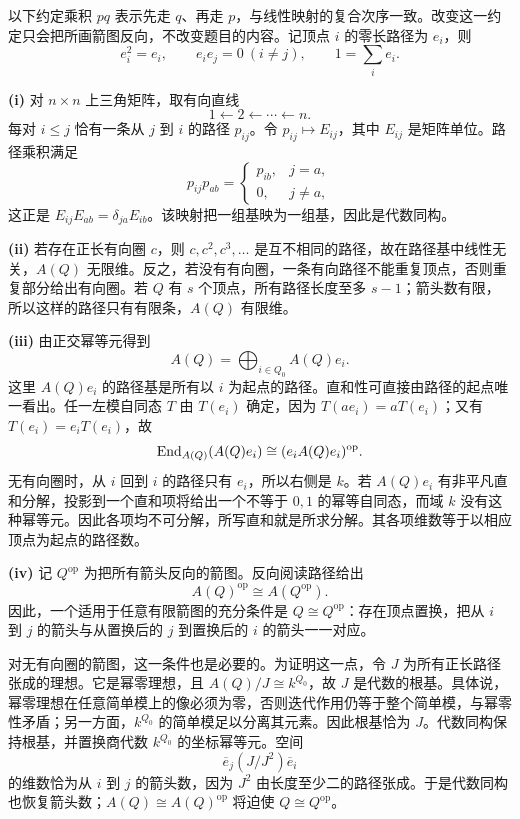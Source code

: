 \begin{solution}
以下约定乘积 $pq$ 表示先走 $q$、再走 $p$，与线性映射的复合次序一致。改变这一约定只会把所画箭图反向，不改变题目的内容。记顶点 $i$ 的零长路径为 $e_i$，则
\[
 e_i^2=e_i,\qquad e_i e_j=0\ (i\ne j),\qquad 1=\sum_i e_i.
\]

\textbf{(i)} 对 $n\times n$ 上三角矩阵，取有向直线
\[
1\longleftarrow2\longleftarrow\cdots\longleftarrow n.
\]
每对 $i\le j$ 恰有一条从 $j$ 到 $i$ 的路径 $p_{ij}$。令 $p_{ij}\mapsto E_{ij}$，其中 $E_{ij}$ 是矩阵单位。路径乘积满足
\[
 p_{ij}p_{ab}=\begin{cases}p_{ib},&j=a,\\0,&j\ne a,\end{cases}
\]
这正是 $E_{ij}E_{ab}=\delta_{ja}E_{ib}$。该映射把一组基映为一组基，因此是代数同构。

\textbf{(ii)} 若存在正长有向圈 $c$，则 $c,c^2,c^3,\ldots$ 是互不相同的路径，故在路径基中线性无关，$A(Q)$ 无限维。反之，若没有有向圈，一条有向路径不能重复顶点，否则重复部分给出有向圈。若 $Q$ 有 $s$ 个顶点，所有路径长度至多 $s-1$；箭头数有限，所以这样的路径只有有限条，$A(Q)$ 有限维。

\textbf{(iii)} 由正交幂等元得到
\[
 A(Q)=\bigoplus_{i\in Q_0}A(Q)e_i.
\]
这里 $A(Q)e_i$ 的路径基是所有以 $i$ 为起点的路径。直和性可直接由路径的起点唯一看出。任一左模自同态 $T$ 由 $T(e_i)$ 确定，因为 $T(ae_i)=aT(e_i)$；又有 $T(e_i)=e_iT(e_i)$，故
\[
 \operatorname{End}_{A(Q)}(A(Q)e_i)\cong(e_iA(Q)e_i)^{\mathrm{op}}.
\]
无有向圈时，从 $i$ 回到 $i$ 的路径只有 $e_i$，所以右侧是 $k$。若 $A(Q)e_i$ 有非平凡直和分解，投影到一个直和项将给出一个不等于 $0,1$ 的幂等自同态，而域 $k$ 没有这种幂等元。因此各项均不可分解，所写直和就是所求分解。其各项维数等于以相应顶点为起点的路径数。

\textbf{(iv)} 记 $Q^{\mathrm{op}}$ 为把所有箭头反向的箭图。反向阅读路径给出
\[
 A(Q)^{\mathrm{op}}\cong A(Q^{\mathrm{op}}).
\]
因此，一个适用于任意有限箭图的充分条件是 $Q\cong Q^{\mathrm{op}}$：存在顶点置换，把从 $i$ 到 $j$ 的箭头与从置换后的 $j$ 到置换后的 $i$ 的箭头一一对应。

对无有向圈的箭图，这一条件也是必要的。为证明这一点，令 $J$ 为所有正长路径张成的理想。它是幂零理想，且 $A(Q)/J\cong k^{Q_0}$，故 $J$ 是代数的根基。具体说，幂零理想在任意简单模上的像必须为零，否则迭代作用仍等于整个简单模，与幂零性矛盾；另一方面，$k^{Q_0}$ 的简单模足以分离其元素。因此根基恰为 $J$。代数同构保持根基，并置换商代数 $k^{Q_0}$ 的坐标幂等元。空间
\[
 \overline e_j(J/J^2)\overline e_i
\]
的维数恰为从 $i$ 到 $j$ 的箭头数，因为 $J^2$ 由长度至少二的路径张成。于是代数同构也恢复箭头数；$A(Q)\cong A(Q)^{\mathrm{op}}$ 将迫使 $Q\cong Q^{\mathrm{op}}$。


\end{solution}
